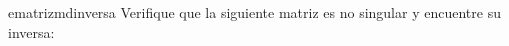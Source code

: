 \begin{examplebox}{}{ematrizmdinversa}
    Verifique que la siguiente matriz es no singular y encuentre su inversa:
    \begin{matrizn}
    \end{matrizn}


\end{examplebox}
